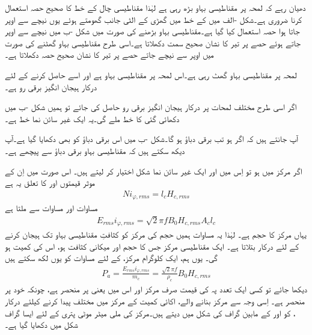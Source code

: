 دھیان رہے کہ لمحہ  پر مقناطیسی بہاو بڑھ رہی ہے لہٰذا مقناطیسی چال کے خط کا صحیح حصہ استعمال کرنا ضروری ہے۔شکل -الف میں    کے خط میں گھڑی کے الٹی جانب گھومتے ہوئے یوں نیچے سے اوپر جاتا ہوا حصہ استعمال کیا گیا ہے۔مقناطیسی بہاو بڑھنے کی صورت میں شکل -ب میں نیچے سے اوپر جاتے  ہوئے حصے پر تیر کا نشان صحیح سمت دکھلاتا ہے۔اسی طرح مقناطیسی بہاو گھٹنے کی صورت میں اوپر سے نیچے جاتے حصے پر تیر کا نشان صحیح حصہ دکھلاتا ہے۔

 لمحہ  پر مقناطیسی بہاو گھٹ رہی ہے۔اس لمحہ پر مقناطیسی بہاو  ہے اور اسے حاصل کرنے کے لئے درکار ہیجان انگیز برقی رو  ہے۔

اگر اسی طرح مختلف لمحات پر درکار ہیجان انگیز برقی رو حاصل کی جائے تو ہمیں شکل -ب میں دکھائی گئی   کا خط ملے گی۔یہ ایک غیر سائن نما خط ہے۔

آپ جانتے ہیں کہ اگر  ہو تب برقی دباؤ  ہو گا۔شکل -ب میں اس برقی دباؤ کو بھی دکھایا گیا ہے۔آپ دیکھ سکتے ہیں کہ مقناطیسی بہاو برقی دباؤ سے  پیچھے ہے۔

 اگر مرکز میں   ہو  تو اِس میں  اور  ایک غیر سائن نما شکل اختیار کر لیتے ہیں۔ اس صورت میں  اِن کے موثر قیمتوں  اور   کا تعلق یہ ہے
\begin{align}\label{مساوات_مقناطیسی_دور_دباؤ_برابر_شدت_ضرب_لمبائی}
N i_{\varphi,rms}=l_c H_{c,rms}
\end{align}
مساوات    اور مساوات   سے ملتا ہے
\begin{align}\label{مساوات_مقناطیسی_دور_درکار_دباؤ_ضرب_رو}
E_{rms} i_{\varphi,rms}=\sqrt{2} \pi f B_0 H_{c,rms} A_c l_c
\end{align}
یہاں  مرکز کا حجم ہے۔ لہٰذا یہ مساوات ہمیں  حجم کی مرکز  کو  کثافتِ مقناطیسی بہاو تک ہیجان کرنے کے لئے درکار  بتلاتا ہے۔ ایک مقناطیسی مرکز جس کا حجم   اور  میکانی کثافت   ہو، اس کی کمیت  ہو گی۔ یوں ہم، ایک کلوگرام  مرکز، کے لئے مساوات    کو یوں لکھ سکتے ہیں
\begin{align}
P_a=\frac{E_{rms} i_{\varphi,rms}}{m_c}=\frac{\sqrt{2} \pi f}{\rho_c} B_0 H_{c,rms}
\end{align}
دیکھا جائے تو کسی ایک تعدد   پہ  کی قیمت صرف مرکز اور اس میں  یعنی  پر منحصر ہے، چونکہ  خود  پر منحصر ہے۔ اِسی وجہ سے مرکز بنانے والے، اکائی کمیت کے مرکز میں مختلف  پیدا کرنے کیلئے درکار ، کو  اور  کے مابین گراف کی شکل میں دیتے ہیں۔مرکز کی  ملی میٹر موٹی پتری کے لئے ایسا گراف  شکل  میں دکھایا گیا ہے۔
